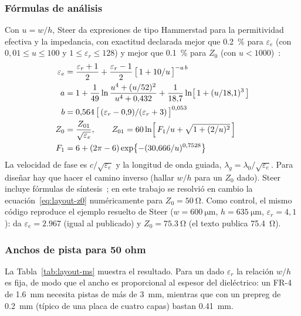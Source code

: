 \subsubsection{Fórmulas de análisis}

Con $u = w/h$, Steer da expresiones de tipo Hammerstad para la permitividad efectiva y la impedancia, con exactitud declarada mejor que \SI{0,2}{\percent} para $\varepsilon_e$ (con $0{,}01 \le u \le 100$ y $1 \le \varepsilon_r \le 128$) y mejor que \SI{0,1}{\percent} para $Z_0$ (con $u < 1000$)~\cite{steer1}:
\begin{align}
  \varepsilon_e &= \frac{\varepsilon_r + 1}{2} + \frac{\varepsilon_r - 1}{2}\,\bigl[\,1 + 10/u\,\bigr]^{-a\,b}\label{eq:layout-ee}\\
  a &= 1 + \frac{1}{49}\ln \frac{u^4 + (u/52)^2}{u^4 + 0{,}432} + \frac{1}{18{,}7}\ln \bigl[\,1 + (u/18{,}1)^3\,\bigr] \notag\\
  b &= 0{,}564\,\bigl[\,(\varepsilon_r - 0{,}9)/(\varepsilon_r + 3)\,\bigr]^{0{,}053} \notag\\
  Z_0 &= \frac{Z_{01}}{\sqrt{\varepsilon_e}}, \qquad Z_{01} = 60\ln \Bigl[\,F_1/u + \sqrt{1 + (2/u)^2}\,\Bigr]\label{eq:layout-z0}\\
  F_1 &= 6 + (2\pi - 6)\exp \bigl\{-(30{,}666/u)^{0{,}7528}\bigr\} \notag
\end{align}
La velocidad de fase es $c/\sqrt{\varepsilon_e}$ y la longitud de onda guiada, $\lambda_g = \lambda_0/\sqrt{\varepsilon_e}$. Para diseñar hay que hacer el camino inverso (hallar $w/h$ para un $Z_0$ dado). Steer incluye fórmulas de síntesis~\cite{steer2}; en este trabajo se resolvió en cambio la ecuación~\eqref{eq:layout-z0} numéricamente para $Z_0 = \SI{50}{\ohm}$. Como control, el mismo código reproduce el ejemplo resuelto de Steer ($w = \SI{600}{\micro\metre}$, $h = \SI{635}{\micro\metre}$, $\varepsilon_r = 4{,}1$): da $\varepsilon_e = \num{2,967}$ (igual al publicado) y $Z_0 = \SI{75,3}{\ohm}$ (el texto publica \SI{75,4}{\ohm}).

\subsubsection{Anchos de pista para 50 ohm}

La Tabla~\ref{tab:layout-ms} muestra el resultado. Para un dado $\varepsilon_r$ la relación $w/h$ es fija, de modo que el ancho es proporcional al espesor del dieléctrico: un FR-4 de \SI{1,6}{\milli\metre} necesita pistas de más de \SI{3}{\milli\metre}, mientras que con un prepreg de \SI{0,2}{\milli\metre} (típico de una placa de cuatro capas) bastan \SI{0,41}{\milli\metre}.

